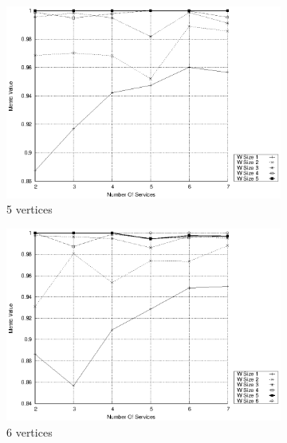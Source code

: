 \begin{figure}[ht]
\begin{subfigure}{0.33\textwidth}
    \includegraphics[width=\textwidth]{Images/graphs/window_quality_performance_diff_qual_n7_s7_20_100_n5}
    \caption{5 vertices}
    \label{fig:quality_window_average_qualitative_n5}
  \end{subfigure}
  \hfill
  \begin{subfigure}{0.33\textwidth}
    \includegraphics[width=\textwidth]{Images/graphs/window_quality_performance_diff_qual_n7_s7_20_100_n6}
    \caption{6 vertices}
    \label{fig:quality_window_average_qualitative_n6}
  \end{subfigure}
  \begin{subfigure}{0.33\textwidth}

\end{subfigure}
\end{figure}
